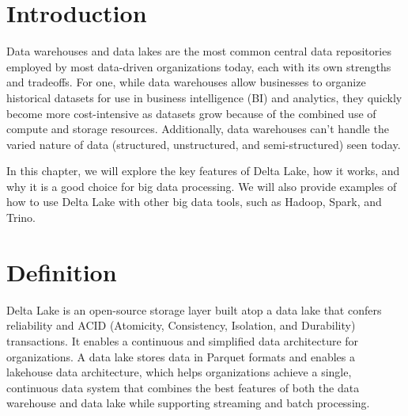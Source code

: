 \section*{Introduction}


Data warehouses and data lakes are the most common central data repositories employed by most data-driven organizations today, each with its own strengths and tradeoffs. For one, while data warehouses allow businesses to organize historical datasets for use in business intelligence (BI) and analytics, they quickly become more cost-intensive as datasets grow because of the combined use of compute and storage resources. Additionally, data warehouses can’t handle the varied nature of data (structured, unstructured, and semi-structured) seen today.

In this chapter, we will explore the key features of Delta Lake, how it works, and why it is a good choice for big data processing. We will also provide examples of how to use Delta Lake with other big data tools, such as Hadoop, Spark, and Trino.
\section{Definition}
Delta Lake is an open-source storage layer built atop a data lake that confers reliability and ACID (Atomicity, Consistency, Isolation, and Durability) transactions. It enables a continuous and simplified data architecture for organizations. A data lake stores data in Parquet formats and enables a lakehouse data architecture, which helps organizations achieve a single, continuous data system that combines the best features of both the data warehouse and data lake while supporting streaming and batch processing.

